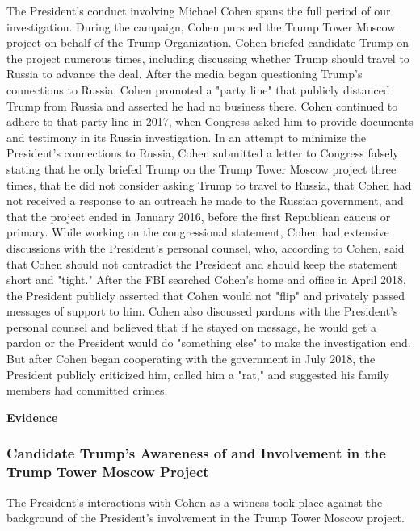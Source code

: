 {The President's conduct involving Michael Cohen spans the full period of our investigation.
During the campaign, Cohen pursued the Trump Tower Moscow project on behalf of the Trump Organization.
Cohen briefed candidate Trump on the project numerous times, including discussing whether Trump should travel to Russia to advance the deal.
After the media began questioning Trump's connections to Russia, Cohen promoted a "party line" that publicly distanced Trump from Russia and asserted he had no business there.
Cohen continued to adhere to that party line in 2017, when Congress asked him to provide documents and testimony in its Russia investigation.
In an attempt to minimize the President's connections to Russia, Cohen submitted a letter to Congress falsely stating that he only briefed Trump on the Trump Tower Moscow project three times, that he did not consider asking Trump to travel to Russia, that Cohen had not received a response to an outreach he made to the Russian government, and that the project ended in January 2016, before the first Republican caucus or primary.
While working on the congressional statement, Cohen had extensive discussions with the President's personal counsel, who, according to Cohen, said that Cohen should not contradict the President and should keep the statement short and "tight."
After the FBI searched Cohen's home and office in April 2018, the President publicly asserted that Cohen would not "flip" and privately passed messages of support to him.
Cohen also discussed pardons with the President's personal counsel and believed that if he stayed on message, he would get a pardon or the President would do "something else" to make the investigation end.
But after Cohen began cooperating with the government in July 2018, the President publicly criticized him, called him a "rat," and suggested his family members had committed crimes.

\begin{center}
\textbf{Evidence}
\end{center}

\subsubsection{Candidate Trump's Awareness of and Involvement in the Trump Tower Moscow Project}

The President's interactions with Cohen as a witness took place against the background of the President's involvement in the Trump Tower Moscow project.

}
